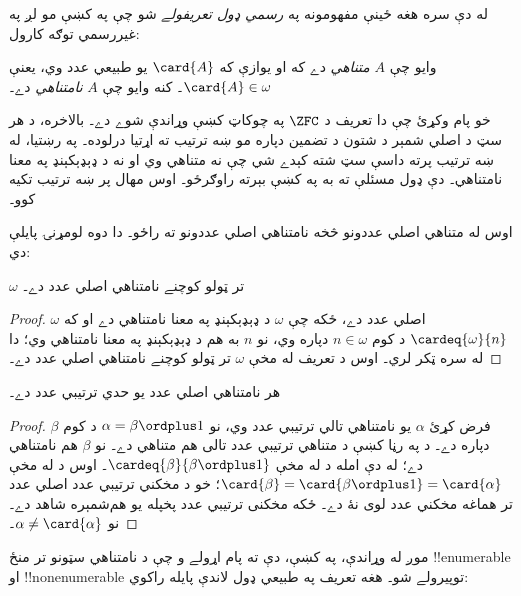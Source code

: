 \documentclass[../../../include/open-logic-section]{subfiles}
\begin{document}
له دې سره هغه ځينې مفهومونه په \emph{رسمي ډول تعريفولے} شو چې
په  کښې مو لږ په غيررسمي توګه کارول:

\begin{defn}
وايو چې $A$ \emph{متناهي} دے که او يوازې که $\card{A}$ يو
طبيعي عدد وي، يعنې $\card{A} \in \omega$۔ کنه وايو چې $A$
\emph{نامتناهي} دے۔
\end{defn}
\noindent
خو پام وکړئ چې دا تعريف د $\ZFC$ په چوکاټ کښې وړاندې شوے دے۔
بالاخره، د هر سټ د اصلي شمېر د شتون د تضمين دپاره مو ښه ترتيب
ته اړتيا درلوده۔ په رښتيا، له ښه ترتيب پرته داسې سټ شته کېدے شي
چې نه متناهي وي او نه د ډېډېکېنډ په معنا نامتناهي۔ دې ډول مسئلې
ته به په  کښې بېرته راوګرځو۔ اوس مهال پر
ښه ترتيب تکيه کوو۔

اوس له متناهي اصلي عددونو څخه نامتناهي اصلي عددونو ته راځو۔
دا دوه لومړنۍ پايلې دي:

\begin{cor}
$\omega$ تر ټولو کوچنے نامتناهي اصلي عدد دے۔
\end{cor}

\begin{proof}
$\omega$ اصلي عدد دے، ځکه چې $\omega$ د ډېډېکېنډ په معنا
نامتناهي دے او که $\cardeq{\omega}{n}$ د کوم $n \in \omega$
دپاره وي، نو $n$ به هم د ډېډېکېنډ په معنا
نامتناهي وي؛ دا له
 سره ټکر لري۔
اوس د تعريف له مخې $\omega$ تر ټولو کوچنے نامتناهي اصلي عدد دے۔
\end{proof}

\begin{cor}
هر نامتناهي اصلي عدد يو حدي ترتيبي عدد دے۔
\end{cor}

\begin{proof}
فرض کړئ $\alpha$ يو نامتناهي تالي ترتيبي عدد وي، نو
$\alpha = \beta \ordplus 1$ د کوم $\beta$ دپاره دے۔ د
 په رڼا کښې د متناهي ترتيبي
عدد تالی هم متناهي دے۔ نو $\beta$ هم نامتناهي دے؛ له دې امله د
 له مخې
$\cardeq{\beta}{\beta \ordplus 1}$۔ اوس د
 له مخې
$\card{\beta} = \card{\beta\ordplus 1} = \card{\alpha}$؛ خو
د مخکني ترتيبي عدد اصلي عدد تر هماغه مخکني عدد لوی نۀ دے۔
ځکه مخکنی ترتيبي عدد پخپله يو هم‌شمېره شاهد دے۔ نو
$\alpha \neq \card{\alpha}$۔
\end{proof}

موږ له وړاندې، په  کښې،
دې ته پام اړولے و چې د نامتناهي سټونو تر منځ !!{enumerable} او
!!{nonenumerable} توپيرولے شو۔ هغه تعريف په طبيعي ډول لاندې
پايله راکوي:
\end{document}

